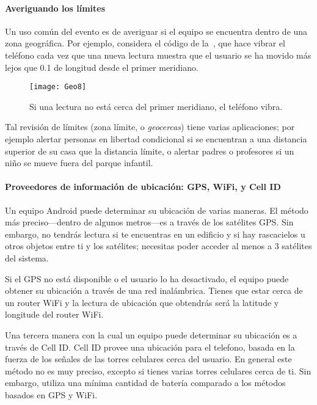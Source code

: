 \paragraph{Averiguando los límites}

Un uso común del evento  es de averiguar si
el equipo se encuentra dentro de una zona geográfica. Por ejemplo,
considera el código de la~, que hace vibrar el teléfono
cada vez que una nueva lectura muestra que el usuario se ha movido más
lejos que 0.1 de longitud desde el primer meridiano.

\begin{figure}[H]
  \centering
  \texttt{[image: Geo8]}
  \caption{Si una lectura no está cerca del primer meridiano, el
    teléfono vibra.}
  \label{fig:Geo8}
\end{figure}

Tal revisión de límites (zona límite, o \emph{geocercas}) tiene varias aplicaciones; por
ejemplo alertar personas en libertad condicional si se encuentran a una
distancia superior de su casa que la distancia límite, o alertar padres
o profesores si un niño se mueve fuera del parque infantil.

\paragraph{Proveedores de información de ubicación: GPS, WiFi, y Cell ID}

Un equipo Android puede determinar su ubicación de varias maneras. El
método más preciso---dentro de algunos metros---es a través de los
satélites GPS. Sin embargo, no tendrás lectura si te encuentras en un
edificio y si hay rascacielos u otros objetos entre ti y los
satélites; necesitas poder acceder al menos a 3 satélites del sistema.

Si el GPS no está disponible o el usuario lo ha desactivado, el equipo
puede obtener su ubicación a través de una red inalámbrica.  Tienes
que estar cerca de un router WiFi y la lectura de ubicación que
obtendrás será la latitude y longitude del router WiFi.

Una tercera manera con la cual un equipo puede determinar su ubicación
es a través de Cell ID. Cell ID provee una ubicación para el telefono,
basada en la fuerza de los señales de las torres celulares cerca del
usuario. En general este método no es muy preciso, excepto si tienes
varias torres celulares cerca de ti. Sin embargo, utiliza una mínima
cantidad de batería comparado a los métodos basados en GPS y WiFi.

